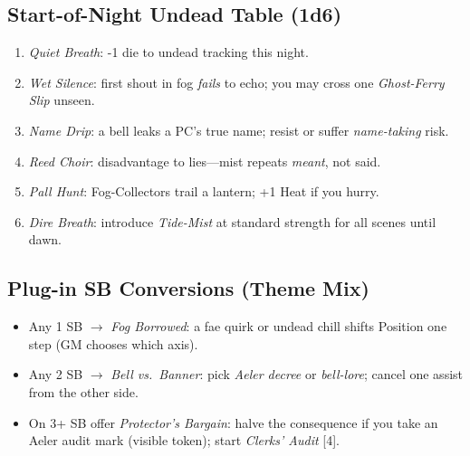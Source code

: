 \subsection*{Start-of-Night Undead Table (1d6)}
\begin{enumerate}
  \item \emph{Quiet Breath}: -1 die to undead tracking this night.
  \item \emph{Wet Silence}: first shout in fog \emph{fails} to echo; you may cross one \emph{Ghost-Ferry Slip} unseen.
  \item \emph{Name Drip}: a bell leaks a PC’s true name; resist or suffer \emph{name-taking} risk.
  \item \emph{Reed Choir}: disadvantage to lies—mist repeats \emph{meant}, not said.
  \item \emph{Pall Hunt}: Fog-Collectors trail a lantern; +1 Heat if you hurry.
  \item \emph{Dire Breath}: introduce \emph{Tide-Mist} at standard strength for all scenes until dawn.
\end{enumerate}

\subsection*{Plug-in SB Conversions (Theme Mix)}
\begin{itemize}
  \item Any 1 SB $\rightarrow$ \emph{Fog Borrowed}: a fae quirk or undead chill shifts Position one step (GM chooses which axis).
  \item Any 2 SB $\rightarrow$ \emph{Bell vs.\ Banner}: pick \emph{Aeler decree} or \emph{bell-lore}; cancel one assist from the other side.
  \item On 3+ SB offer \emph{Protector’s Bargain}: halve the consequence if you take an Aeler audit mark (visible token); start \emph{Clerks’ Audit} [4].
\end{itemize}